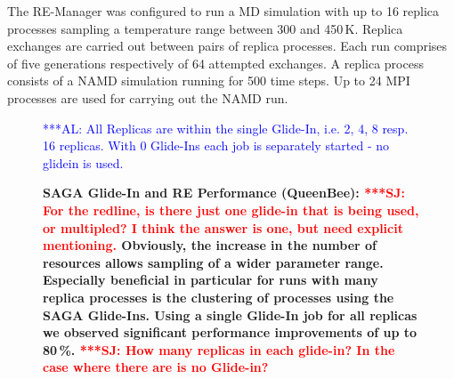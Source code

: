 \documentclass{rspublic}
\newcommand{\alnote}[1]{ {\textcolor{blue} { ***AL: #1 }}}
\newcommand{\jhanote}[1]{ {\textcolor{red} { ***SJ: #1 }}}
\newcommand{\alnote}[1]{}
\newcommand{\jhanote}[1]{}
\begin{document}
{The RE-Manager was configured to run a MD simulation with up to 16 replica processes 
sampling a temperature range between 300 and 450\,K. Replica exchanges are carried 
out between pairs of replica processes. Each run comprises of
five generations respectively of 64 attempted exchanges.  
A replica process consists of a NAMD simulation running
for 500 time steps. Up to 24 MPI processes are used for carrying out
the NAMD run.

\begin{figure}[th]
    \centering      
        \caption{\footnotesize \bf SAGA Glide-In and RE Performance
          (QueenBee): \jhanote{For the redline, is there just one
            glide-in that is being used, or multipled? I think the
            answer is one, but need explicit mentioning.} 
          Obviously,
          the increase in the number of resources allows sampling of a
          wider parameter range. Especially beneficial in particular
          for runs with many replica processes is the clustering of
          processes using the SAGA Glide-Ins. Using a single Glide-In
          job for all replicas we observed significant performance 
          improvements of up to 80\,\%.
          \jhanote{How many
            replicas in each glide-in? In the case where there are is
            no Glide-in?}}     
           \alnote{All Replicas are within the single Glide-In, i.e. 2, 4, 8 resp. 16 replicas.
           With 0 Glide-Ins each job is separately started - no glidein is used.}
    \label{fig:perf_remd_glidin}
\end{figure} 

}
\end{document}
